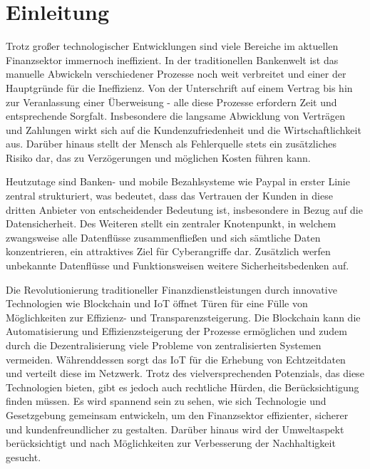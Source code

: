 \section{Einleitung}





Trotz gro\ss er technologischer Entwicklungen sind viele Bereiche im aktuellen Finanzsektor immernoch 
ineffizient.
In der traditionellen Bankenwelt ist das manuelle Abwickeln verschiedener 
Prozesse noch weit verbreitet und einer der Hauptgründe für die Ineffizienz. 
Von der Unterschrift auf einem Vertrag bis hin zur Veranlassung einer 
Überweisung - alle diese Prozesse erfordern Zeit und entsprechende Sorgfalt. Insbesondere die langsame 
Abwicklung von Verträgen und Zahlungen wirkt sich auf die Kundenzufriedenheit und die Wirtschaftlichkeit 
aus. Darüber hinaus stellt der Mensch als Fehlerquelle stets ein zusätzliches Risiko dar, das zu 
Verzögerungen und möglichen Kosten führen kann.

Heutzutage sind Banken- und mobile Bezahlsysteme wie Paypal in erster Linie zentral strukturiert, was 
bedeutet, dass das Vertrauen der Kunden in diese dritten Anbieter von entscheidender Bedeutung ist, 
insbesondere in Bezug auf die Datensicherheit. Des Weiteren stellt ein zentraler Knotenpunkt, in welchem
zwangsweise alle Datenflüsse zusammenflie\ss en und sich sämtliche Daten konzentrieren, ein attraktives 
Ziel für Cyberangriffe dar. Zusätzlich werfen unbekannte Datenflüsse und Funktionsweisen weitere 
Sicherheitsbedenken auf.


Die Revolutionierung traditioneller Finanzdienstleistungen durch innovative Technologien wie 
Blockchain und IoT öffnet Türen für eine Fülle von Möglichkeiten zur Effizienz- und Transparenzsteigerung.
Die Blockchain kann die Automatisierung und Effizienzsteigerung der Prozesse ermöglichen und zudem durch
die Dezentralisierung viele Probleme von zentralisierten Systemen vermeiden. Währenddessen sorgt das IoT
für die Erhebung von Echtzeitdaten und verteilt diese im Netzwerk.
Trotz des vielversprechenden Potenzials, das diese Technologien bieten, gibt es jedoch 
auch rechtliche Hürden, die Berücksichtigung finden müssen. Es wird spannend sein zu sehen, wie sich 
Technologie und Gesetzgebung gemeinsam entwickeln, um den Finanzsektor effizienter, sicherer und 
kundenfreundlicher zu gestalten. Darüber hinaus wird der Umweltaspekt berücksichtigt und 
nach Möglichkeiten zur Verbesserung der Nachhaltigkeit gesucht.

